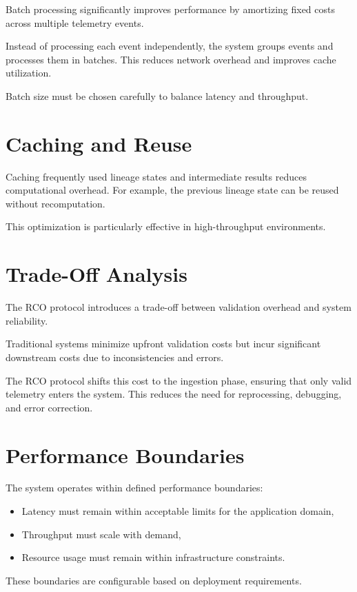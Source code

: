 Batch processing significantly improves performance by amortizing fixed costs across multiple telemetry events.

Instead of processing each event independently, the system groups events and processes them in batches. This reduces network overhead and improves cache utilization.

Batch size must be chosen carefully to balance latency and throughput.

\section{Caching and Reuse}

Caching frequently used lineage states and intermediate results reduces computational overhead. For example, the previous lineage state can be reused without recomputation.

This optimization is particularly effective in high-throughput environments.

\section{Trade-Off Analysis}

The RCO protocol introduces a trade-off between validation overhead and system reliability.

Traditional systems minimize upfront validation costs but incur significant downstream costs due to inconsistencies and errors.

The RCO protocol shifts this cost to the ingestion phase, ensuring that only valid telemetry enters the system. This reduces the need for reprocessing, debugging, and error correction.

\section{Performance Boundaries}

The system operates within defined performance boundaries:

\begin{itemize}
\item Latency must remain within acceptable limits for the application domain,
\item Throughput must scale with demand,
\item Resource usage must remain within infrastructure constraints.
\end{itemize}

These boundaries are configurable based on deployment requirements.

